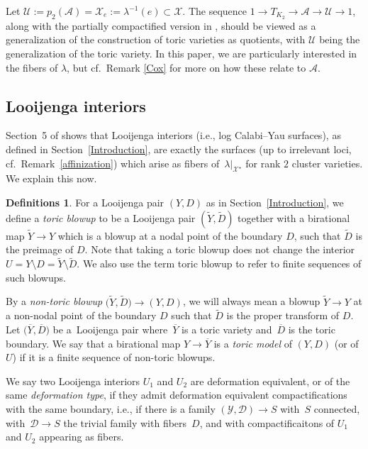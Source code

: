 \documentclass[pdftex]{sigma}
\numberwithin{equation}{section}
\numberwithin{figure}{section}
\numberwithin{table}{section}
\let\?=\overline
\let\rar=\rightarrow
\let\s=\mathcal
\let\wt=\widetilde
\theoremstyle{definition}
\newtheorem{dfns}[thm]{Definitions}
\begin{document}
Let $\s{U}:=p_2(\s{A})=\s{X}_e:=\lambda^{-1}(e)\subset \s{X}$. The sequence $1\rar T_{K_2} \rar \s{A} \rar \s{U} \rar 1$, along with the partially compactified version in \cite[Section~2]{ManCox}, should be viewed as a generalization of the construction of toric varieties as quotients, with $\s{U}$ being the generalization of the toric variety.
 In this paper, we are particularly interested in the fibers of $\lambda$, but cf.\ Remark \ref{Cox} for more on how these relate to $\s{A}$.

\subsection{Looijenga interiors}\label{Looijenga seeds}

Section~5 of \cite{GHK3} shows that Looijenga interiors (i.e., log Calabi--Yau surfaces), as defined in Section~\ref{Introduction}, are exactly the surfaces (up to irrelevant loci, cf.\ Remark~\ref{affinization}) which arise as fibers of~$\lambda|_{\s{X}^{\star}}$ for rank $2$ cluster varieties. We explain this now.

\begin{dfns}
For a Looijenga pair $(Y,D)$ as in Section~\ref{Introduction}, we define a {\it toric blowup} to be a Looijenga pair $(\wt{Y},\wt{D})$ together with a birational map $\wt{Y}\rar Y$ which is a blowup at a nodal point of the boundary $D$, such that $\wt{D}$ is the preimage of $D$. Note that taking a toric blowup does not change the interior $U = Y\setminus D = \wt{Y}\setminus \wt{D}$. We also use the term toric blowup to refer to finite sequences of such blowups.

By a {\it non-toric blowup} $\big(\wt{Y},\wt{D}\big)\rar (Y,D)$, we will always mean a blowup $\wt{Y}\rar Y$ at a non-nodal point of the boundary $D$ such that $\wt{D}$ is the proper transform of $D$. Let $\big(\?{Y},\?{D}\big)$ be a~Looijenga pair where~$\?{Y}$ is a toric variety and~$\?{D}$ is the toric boundary. We say that a birational map $Y \rar \?{Y}$ is a {\it toric model} of $(Y,D)$ (or of $U$) if it is a finite sequence of non-toric blowups.

We say two Looijenga interiors $U_1$ and $U_2$ are deformation equivalent, or of the same \textit{deformation type}, if they admit deformation equivalent compactifications with the same boundary, i.e., if there is a family $(\s{Y},\s{D}) \rar S$ with~$S$ connected, with~$\s{D}\rar S$ the trivial family with fibers~$D$, and with compactificaitons of $U_1$ and $U_2$ appearing as fibers.
\end{dfns}
\end{document}
